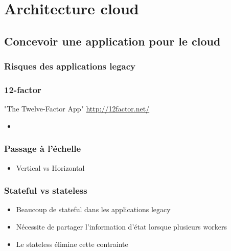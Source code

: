   \section{Architecture cloud}

  \subsection{Concevoir une application pour le cloud}

  \begin{frame}
    \frametitle{Risques des applications legacy}

  \end{frame}

  \begin{frame}
    \frametitle{12-factor}
    "The Twelve-Factor App" \url{http://12factor.net/}
    \begin{itemize}
      \item 
    \end{itemize}
  \end{frame}

  \begin{frame}
    \frametitle{Passage à l'échelle}
    \begin{itemize}
      \item Vertical vs Horizontal
    \end{itemize}
  \end{frame}

  \begin{frame}
    \frametitle{Stateful vs stateless}
    \begin{itemize}
      \item Beaucoup de stateful dans les applications legacy
      \item Nécessite de partager l'information d'état lorsque plusieurs workers
      \item Le stateless élimine cette contrainte
    \end{itemize}
  \end{frame}

